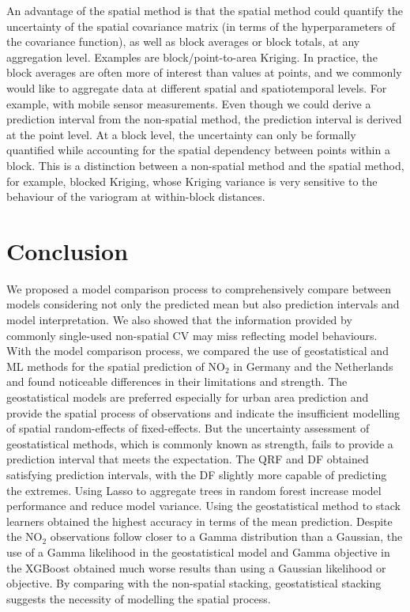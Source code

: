 \documentclass{article}
\begin{document}
An advantage of the spatial method is that the spatial method could quantify the uncertainty of the spatial covariance matrix (in terms of the hyperparameters of the covariance function), as well as block averages or block totals, at any aggregation level. Examples are block/point-to-area Kriging. In practice, the block averages are often more of interest than values at points, and we commonly would like to aggregate data at different spatial and spatiotemporal levels. For example, with mobile sensor measurements. Even though we could derive a prediction interval from the non-spatial method, the prediction interval is derived at the point level. At a block level, the uncertainty can only be formally quantified while accounting for the spatial dependency between points within a block. This is a distinction between a non-spatial method and the spatial method, for example, blocked Kriging, whose Kriging variance is very sensitive to the behaviour of the variogram at within-block distances. 

\section{Conclusion}
We proposed a model comparison process to comprehensively compare between models considering not only the predicted mean but also prediction intervals and model interpretation. We also showed that the information provided by commonly single-used non-spatial CV may miss reflecting model behaviours. With the model comparison process, we compared the use of geostatistical and ML methods for the spatial prediction of NO$_2$ in Germany and the Netherlands and found noticeable differences in their limitations and strength. The geostatistical models are preferred especially for urban area prediction and provide the spatial process of observations and indicate the insufficient modelling of spatial random-effects of fixed-effects. But the uncertainty assessment of geostatistical methods, which is commonly known as strength, fails to provide a prediction interval that meets the expectation. The QRF and DF obtained satisfying prediction intervals, with the DF slightly more capable of predicting the extremes. Using Lasso to aggregate trees in random forest increase model performance and reduce model variance. Using the geostatistical method to stack learners obtained the highest accuracy in terms of the mean prediction. Despite the NO$_2$ observations follow closer to a Gamma distribution than a Gaussian, the use of a Gamma likelihood in the geostatistical model and Gamma objective in the XGBoost obtained much worse results than using a Gaussian likelihood or objective. By comparing with the non-spatial stacking, geostatistical stacking suggests the necessity of modelling the spatial process.  

\newpage



\end{document}
